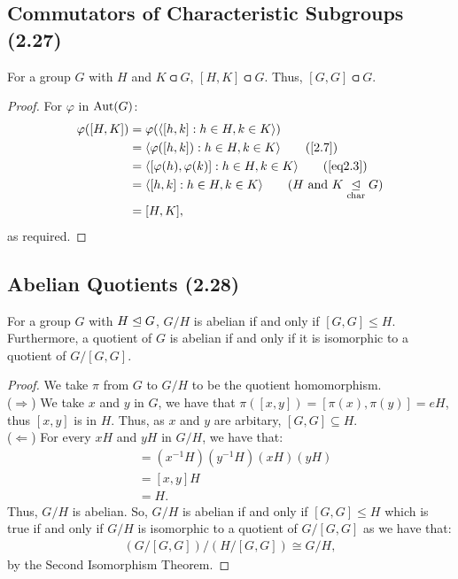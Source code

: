 \subsection{Commutators of Characteristic Subgroups (2.27)} \label{2.27}

For a group $G$ with $H$ and $K \csub G$, $[H, K] \csub G$. Thus, $[G, G] \csub G$.

\begin{proof}
    For $\varphi$ in $\operatorname{Aut}(G)$: \begin{align*}
        \varphi([H, K]) 
        &= \varphi(\ang{[h, k] : h \in H, k \in K}) \\
        &= \ang{\varphi([h, k]) : h \in H, k \in K} \tag{\ref{2.7}} \\
        &= \ang{[\varphi(h), \varphi(k)] : h \in H, k \in K} \tag{\ref{eq2.3}} \\
        &= \ang{[h, k] : h \in H, k \in K} \tag{$H$ and $K \csub G$} \\
        &= [H, K],
    \end{align*} as required.
\end{proof}

\subsection{Abelian Quotients (2.28)} \label{2.28}

For a group $G$ with $H \trianglelefteq G$, $G / H$ is abelian if and only if 
$[G, G] \leq H$. Furthermore, a quotient of $G$
is abelian if and only if it is isomorphic to a quotient of $G / [G, G]$.

\begin{proof}
    We take $\pi$ from $G$ to $G / H$ to be the quotient homomorphism.
    \\[\baselineskip]
    ($\Longrightarrow$) 
    We take $x$ and $y$ in $G$, we have that $\pi([x, y]) = [\pi(x), \pi(y)] = eH$,
    thus $[x, y]$ is in $H$. Thus, as $x$ and $y$ are arbitary, $[G, G] \subseteq H$.
    \\[\baselineskip]
    ($\Longleftarrow$)
    For every $xH$ and $yH$ in $G / H$, we have that: \begin{align*}
        [xH, yH] 
        &= (x^{-1}H)(y^{-1}H)(xH)(yH) \\
        &= [x, y]H \\
        &= H.
    \end{align*} Thus, $G / H$ is abelian. So, $G / H$ is abelian if
    and only if $[G, G] \leq H$ which is true if and only if $G / H$ is isomorphic
    to a quotient of $G / [G, G]$ as we have that: \begin{align*}
        (G / [G, G]) / (H / [G, G]) \cong G / H,
    \end{align*} by the Second Isomorphism Theorem.
\end{proof}

